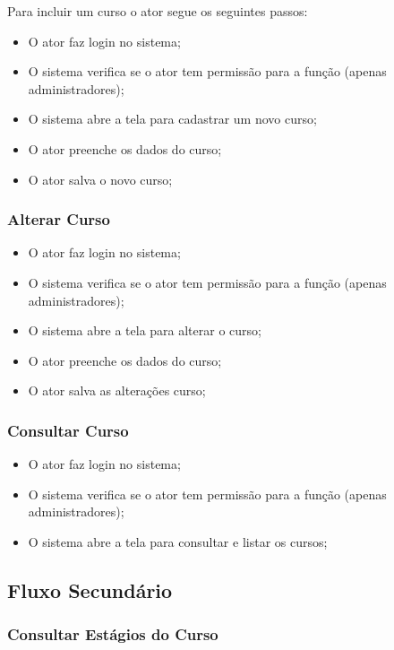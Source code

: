 Para incluir um curso o ator segue os seguintes passos:

\begin{itemize}
  \item O ator faz login no sistema;
  \item O sistema verifica se o ator tem permissão para a função (apenas
  administradores);
  \item O sistema abre a tela para cadastrar um novo curso;
  \item O ator preenche os dados do curso;
  \item O ator salva o novo curso; 
\end{itemize}


\subsubsection{Alterar Curso}

\begin{itemize}
  \item O ator faz login no sistema;
  \item O sistema verifica se o ator tem permissão para a função (apenas
  administradores);
  \item O sistema abre a tela para alterar o curso;
  \item O ator preenche os dados do curso;
  \item O ator salva as alterações curso; 
\end{itemize}

\subsubsection{Consultar Curso}

\begin{itemize}
  \item O ator faz login no sistema;
  \item O sistema verifica se o ator tem permissão para a função (apenas
  administradores);
  \item O sistema abre a tela para consultar e listar os cursos; 
\end{itemize}

\subsection{Fluxo Secundário}

\subsubsection{Consultar Estágios do Curso}

